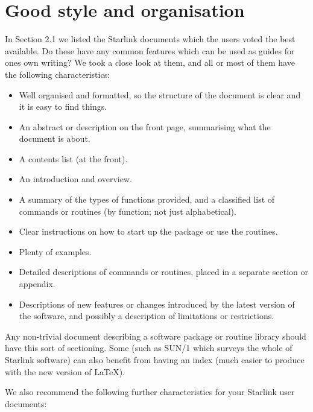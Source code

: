 \documentclass[twoside,11pt]{article}
\newcommand{\htmlref}[2]{#1}
\newcommand{\xref}[3]{#1}
\begin{document}
\section{\label{GoodStyle}Good style and organisation}

In \htmlref{Section 2.1}{BestDocs} we listed the Starlink documents which
the users voted the best available.
Do these have any common features which can be used as guides for ones own
writing?
We took a close look at them, and all or most of them have the following
characteristics:

\begin{itemize}
\item Well organised and formatted, so the structure of the document
is clear and it is easy to find things.
\item An abstract or description on the front page, summarising what the
document is about.
\item A contents list (at the front).
\item An introduction and overview.
\item A summary of the types of functions provided, and a classified list of
commands or routines (by function; not just alphabetical).
\item Clear instructions on how to start up the package or use the routines.
\item Plenty of examples.
\item Detailed descriptions of commands or routines, placed in a separate
section or appendix.
\item Descriptions of new features or changes introduced by the latest version
of the software, and possibly a description of limitations or restrictions.
\end{itemize}

Any non-trivial document describing a software package or routine library
should have this sort of sectioning.
Some (such as \xref{SUN/1}{sun1}{} which surveys the whole of Starlink
software) can also benefit from having an index (much easier to produce with
the new version of \LaTeX).

We also recommend the following further characteristics for your Starlink user
documents:
\end{document}
